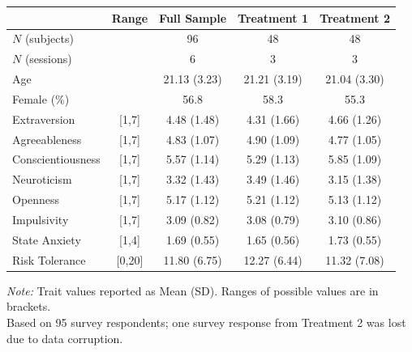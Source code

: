 \begingroup
\centering
\scriptsize
\begin{tabular}{lcccc}
\toprule
 & Range & Full Sample & Treatment 1 & Treatment 2 \\
\midrule
  $N$ (subjects) & & 96 & 48 & 48 \\
  $N$ (sessions) & & 6 & 3 & 3 \\
  Age & & 21.13 (3.23) & 21.21 (3.19) & 21.04 (3.30) \\
  Female (\%) & & 56.8 & 58.3 & 55.3 \\
\midrule
  Extraversion & [1,7] & 4.48 (1.48) & 4.31 (1.66) & 4.66 (1.26) \\
  Agreeableness & [1,7] & 4.83 (1.07) & 4.90 (1.09) & 4.77 (1.05) \\
  Conscientiousness & [1,7] & 5.57 (1.14) & 5.29 (1.13) & 5.85 (1.09) \\
  Neuroticism & [1,7] & 3.32 (1.43) & 3.49 (1.46) & 3.15 (1.38) \\
  Openness & [1,7] & 5.17 (1.12) & 5.21 (1.12) & 5.13 (1.12) \\
  Impulsivity & [1,7] & 3.09 (0.82) & 3.08 (0.79) & 3.10 (0.86) \\
  State Anxiety & [1,4] & 1.69 (0.55) & 1.65 (0.56) & 1.73 (0.55) \\
  Risk Tolerance & [0,20] & 11.80 (6.75) & 12.27 (6.44) & 11.32 (7.08) \\
\bottomrule
\end{tabular}
\par
\vspace{2pt}
{\footnotesize \textit{Note:} Trait values reported as Mean (SD). Ranges of possible values are in brackets.}\\
{\footnotesize Based on 95 survey respondents; one survey response from Treatment 2 was lost due to data corruption.}
\endgroup
